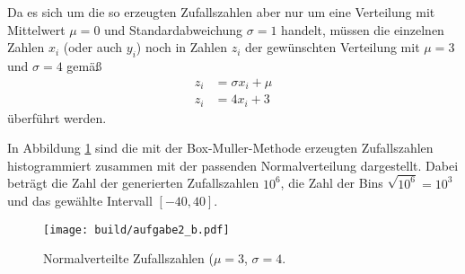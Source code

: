 Da es sich um die so erzeugten Zufallszahlen aber nur um eine Verteilung mit Mittelwert $\mu = 0$ und Standardabweichung $\sigma = 1$ handelt,
müssen die einzelnen Zahlen $x_i$ (oder auch $y_i$) noch in Zahlen $z_i$ der gewünschten Verteilung mit $ \mu = 3$ und $\sigma = 4$ gemäß
\begin{align*}
  z_i &= \sigma x_i + \mu \\
  z_i &= 4 x_i + 3
\end{align*}
überführt werden.

In Abbildung \ref{fig:a2_b} sind die mit der Box-Muller-Methode erzeugten Zufallszahlen histogrammiert zusammen mit der passenden Normalverteilung
dargestellt. Dabei beträgt die Zahl der generierten Zufallszahlen $10^{6}$, die Zahl der Bins $\sqrt{10^6} = 10^3$ und das gewählte Intervall $[-40, 40]$.

\begin{figure}[h]
  \centering
  \texttt{[image: build/aufgabe2\_b.pdf]}
  \caption{Normalverteilte Zufallszahlen ($\mu = 3$, $\sigma = 4$.}
  \label{fig:a2_b}
\end{figure}



